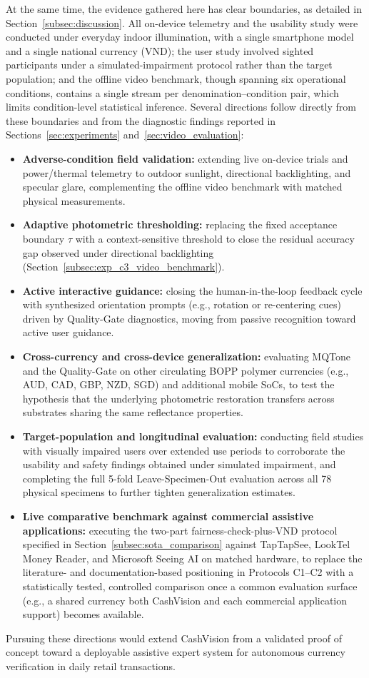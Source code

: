 \documentclass[final,5p,times,twocolumn,authoryear]{elsarticle}
\begin{document}
At the same time, the evidence gathered here has clear boundaries, as detailed in Section~\ref{subsec:discussion}. All on-device telemetry and the usability study were conducted under everyday indoor illumination, with a single smartphone model and a single national currency (VND); the user study involved sighted participants under a simulated-impairment protocol rather than the target population; and the offline video benchmark, though spanning six operational conditions, contains a single stream per denomination--condition pair, which limits condition-level statistical inference. Several directions follow directly from these boundaries and from the diagnostic findings reported in Sections~\ref{sec:experiments} and~\ref{sec:video_evaluation}:
\begin{itemize}
    \item \textbf{Adverse-condition field validation:} extending live on-device trials and power/thermal telemetry to outdoor sunlight, directional backlighting, and specular glare, complementing the offline video benchmark with matched physical measurements.
    \item \textbf{Adaptive photometric thresholding:} replacing the fixed acceptance boundary $\tau$ with a context-sensitive threshold to close the residual accuracy gap observed under directional backlighting (Section~\ref{subsec:exp_c3_video_benchmark}).
    \item \textbf{Active interactive guidance:} closing the human-in-the-loop feedback cycle with synthesized orientation prompts (e.g., rotation or re-centering cues) driven by Quality-Gate diagnostics, moving from passive recognition toward active user guidance.
    \item \textbf{Cross-currency and cross-device generalization:} evaluating MQTone and the Quality-Gate on other circulating BOPP polymer currencies (e.g., AUD, CAD, GBP, NZD, SGD) and additional mobile SoCs, to test the hypothesis that the underlying photometric restoration transfers across substrates sharing the same reflectance properties.
    \item \textbf{Target-population and longitudinal evaluation:} conducting field studies with visually impaired users over extended use periods to corroborate the usability and safety findings obtained under simulated impairment, and completing the full 5-fold Leave-Specimen-Out evaluation across all 78 physical specimens to further tighten generalization estimates.
    \item \textbf{Live comparative benchmark against commercial assistive applications:} executing the two-part fairness-check-plus-VND protocol specified in Section~\ref{subsec:sota_comparison} against TapTapSee, LookTel Money Reader, and Microsoft Seeing AI on matched hardware, to replace the literature- and documentation-based positioning in Protocols C1--C2 with a statistically tested, controlled comparison once a common evaluation surface (e.g., a shared currency both CashVision and each commercial application support) becomes available.
\end{itemize}
Pursuing these directions would extend CashVision from a validated proof of concept toward a deployable assistive expert system for autonomous currency verification in daily retail transactions.
\end{document}
